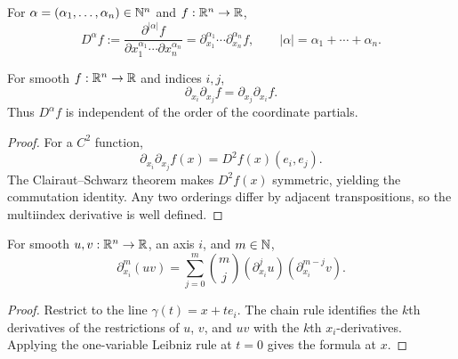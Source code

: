\begin{definition}
\label{def:multiindex-partial-derivative}





For $\alpha=(\alpha_1,\ldots,\alpha_n)\in\mathbb{N}^n$ and
$f : \mathbb{R}^n \to \mathbb{R}$,
\[
D^\alpha f := \frac{\partial^{|\alpha|}f}
 {\partial x_1^{\alpha_1}\cdots\partial x_n^{\alpha_n}}
= \partial_{x_1}^{\alpha_1}\cdots\partial_{x_n}^{\alpha_n}f,
\qquad |\alpha|=\alpha_1+\cdots+\alpha_n.
\]
\end{definition}

\begin{proposition}
\label{prop:clairaut-partial-commute}





For smooth $f : \mathbb{R}^n \to \mathbb{R}$ and indices $i,j$,
\[
\partial_{x_i}\partial_{x_j}f=\partial_{x_j}\partial_{x_i}f.
\]
Thus $D^\alpha f$ is independent of the order of the coordinate partials.
\end{proposition}
\begin{proof}

\sketch
For a $C^2$ function,
\[
\partial_{x_i}\partial_{x_j}f(x)=D^2f(x)(e_i,e_j).
\]
The Clairaut--Schwarz theorem makes $D^2f(x)$ symmetric, yielding the
commutation identity. Any two orderings differ by adjacent transpositions,
so the multiindex derivative is well defined.
\end{proof}

\begin{proposition}
\label{prop:iterated-leibniz-one-axis}





For smooth $u,v : \mathbb{R}^n \to \mathbb{R}$, an axis $i$, and $m\in\mathbb{N}$,
\[
\partial_{x_i}^m(uv)=\sum_{j=0}^m\binom{m}{j}
(\partial_{x_i}^j u)(\partial_{x_i}^{m-j}v).
\]
\end{proposition}
\begin{proof}

\sketch
Restrict to the line $\gamma(t)=x+te_i$. The chain rule identifies the
$k$th derivatives of the restrictions of $u$, $v$, and $uv$ with the
$k$th $x_i$-derivatives. Applying the one-variable Leibniz rule at $t=0$
gives the formula at $x$.
\end{proof}

